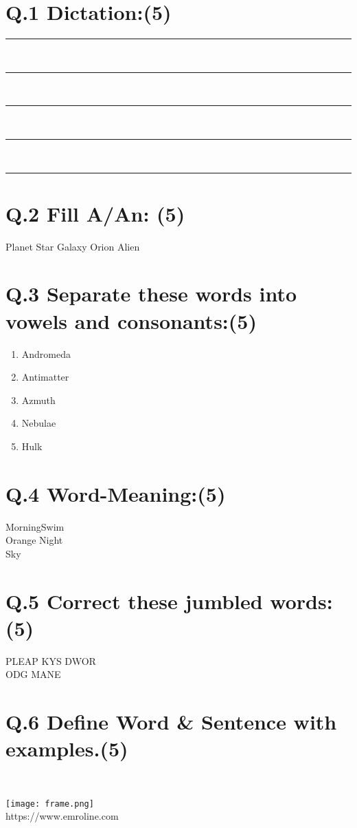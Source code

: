 \documentclass[12pt,letterpaper]{article}
\begin{document}
\section*{Q.1 Dictation:(5)}
\rule{400}{.2} \\
\rule{400}{.2} \\
\rule{400}{.2} \\
\rule{400}{.2} \\
\rule{400}{.2}
\section*{Q.2 Fill A/An: (5)}

\begin{enumerate}
    Planet \hspace{40} Star \hspace{40} Galaxy \hspace{40} Orion \hspace{40} Alien
\end{enumerate}
\section*{Q.3 Separate these words into vowels and consonants:(5)}
\begin{enumerate}
    \item Andromeda
    \item Antimatter
    \item Azmuth
    \item Nebulae
    \item Hulk
\end{enumerate}
\section*{Q.4 Word-Meaning:(5)}
\begin{enumerate}
    Morning\hspace{150}Swim
    \\Orange\hspace{150} Night
    \\ Sky
\end{enumerate}
\section*{Q.5 Correct these jumbled words:(5) }
\begin{enumerate}
PLEAP \hspace{120} KYS \hspace{120} DWOR \hspace{120} \\ODG \hspace{120} MANE
\end{enumerate}
\section*{Q.6 Define Word \& Sentence with examples.(5)}\\
\begin{center}
\texttt{[image: frame.png]}\\
\caption{https://www.emroline.com}
\end{center}
\end{document}
